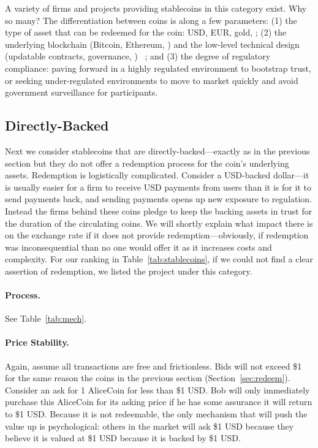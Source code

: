 A variety of firms and projects providing stablecoins in this category exist. Why so many? The differentiation between coins is along a few parameters: (1) the type of asset that can be redeemed for the coin: USD, EUR, gold, \etc; (2) the underlying blockchain (\eg Bitcoin, Ethereum, \etc) and the low-level technical design (updatable contracts, governance, \etc) ~\cite{geminido29:online}; and (3) the degree of regulatory compliance: paving forward in a highly regulated environment to bootstrap trust, or seeking under-regulated environments to move to market quickly and avoid government surveillance for participants.


\subsection{Directly-Backed}
\label{sec:tether}

Next we consider stablecoins that are directly-backed---exactly as in the previous section but they do not offer a redemption process for the coin's underlying assets. Redemption is logistically complicated. Consider a USD-backed dollar---it is usually easier for a firm to receive USD payments from users than it is for it to send payments back, and sending payments opens up new exposure to regulation. Instead the firms behind these coins  pledge to keep the backing assets in trust for the duration of the circulating coins. We will shortly explain what impact there is on the exchange rate if it does not provide redemption---obviously, if redemption was inconsequential than no one would offer it as it increases costs and complexity. For our ranking in Table~\ref{tab:stablecoins}, if we could not find a clear assertion of redemption, we listed the project under this category.

\paragraph{Process.} See Table~\ref{tab:mech}.

\paragraph{Price Stability.} Again, assume all transactions are free and frictionless. Bids will not exceed \$1 for the same reason the coins in the previous section (Section~\ref{sec:redeem}). Consider an ask for 1 AliceCoin for less than \$1 USD. Bob will only immediately purchase this AliceCoin for its asking price if he has some assurance it will return to \$1 USD. Because it is not redeemable, the only mechanism that will push the value up is psychological: others in the market will ask \$1 USD because they believe it is valued at \$1 USD because it is backed by \$1 USD.


